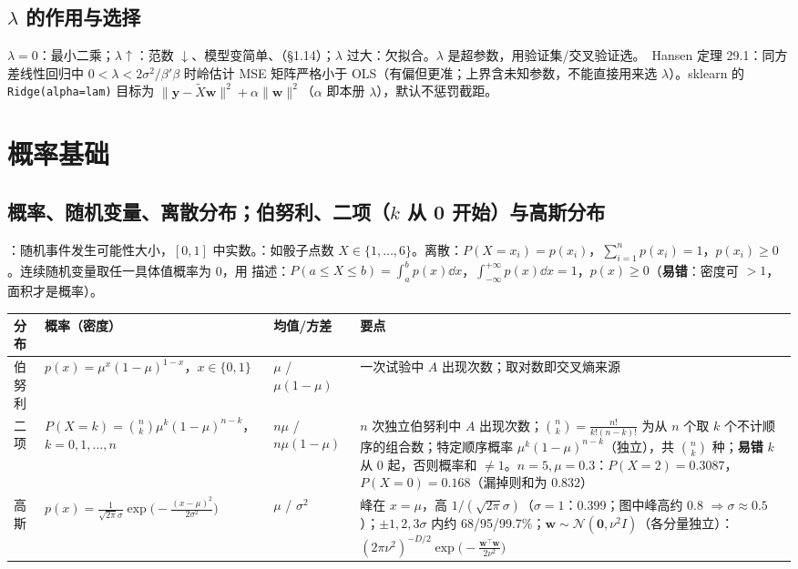 \subsection{\texorpdfstring{$\lambda$}{lambda} 的作用与选择}
$\lambda=0$：最小二乘；$\lambda\uparrow$：范数 $\downarrow$、模型变简单、（§1.14）；$\lambda$ 过大：欠拟合。$\lambda$ 是超参数，用验证集/交叉验证选。\tagext\ Hansen 定理 29.1：同方差线性回归中 $0<\lambda<2\sigma^2/\beta'\beta$ 时岭估计 MSE 矩阵严格小于 OLS（有偏但更准；上界含未知参数，不能直接用来选 $\lambda$）。sklearn 的 \texttt{Ridge(alpha=lam)} 目标为 $\|\bm y-\tilde X\bm w\|^2+\alpha\|\bm w\|^2$（$\alpha$ 即本册 $\lambda$），默认不惩罚截距。

\section{概率基础}

\subsection{概率、随机变量、离散分布；伯努利、二项（\texorpdfstring{$k$}{k} 从 0 开始）与高斯分布}
：随机事件发生可能性大小，$[0,1]$ 中实数。：如骰子点数 $X\in\{1,\dots,6\}$。离散：$P(X=x_i)=p(x_i)$，$\sum_{i=1}^np(x_i)=1$，$p(x_i)\ge0$。连续随机变量取任一具体值概率为 0，用 描述：$P(a\le X\le b)=\int_a^bp(x)\dd x$，$\int_{-\infty}^{+\infty}p(x)\dd x=1$，$p(x)\ge0$（\textbf{易错}：密度可 $>1$，面积才是概率）。
\begin{center}\small
\begin{tabularx}{\linewidth}{@{}p{1.9cm}>{\raggedright\arraybackslash}p{5.5cm}p{2cm}L@{}}
\toprule
分布 & 概率（密度）& 均值/方差 & 要点 \\
\midrule
伯努利 & $p(x)=\mu^x(1-\mu)^{1-x}$，$x\in\{0,1\}$ & $\mu$ / $\mu(1-\mu)$ & 一次试验中 $A$ 出现次数；取对数即交叉熵来源 \\
二项 & $P(X{=}k)=\binom nk\mu^k(1-\mu)^{n-k}$，$k=0,1,\dots,n$ & $n\mu$ / $n\mu(1-\mu)$ & $n$ 次独立伯努利中 $A$ 出现次数；$\binom nk=\frac{n!}{k!(n-k)!}$ 为从 $n$ 个取 $k$ 个不计顺序的组合数；特定顺序概率 $\mu^k(1-\mu)^{n-k}$（独立），共 $\binom nk$ 种；\textbf{易错} $k$ 从 0 起，否则概率和 $\neq1$。$n{=}5,\mu{=}0.3$：$P(X{=}2)=0.3087$，$P(X{=}0)=0.168$（漏掉则和为 $0.832$）\\
高斯 & $p(x)=\frac1{\sqrt{2\pi}\sigma}\exp\big(-\frac{(x-\mu)^2}{2\sigma^2}\big)$ & $\mu$ / $\sigma^2$ & 峰在 $x=\mu$，高 $1/(\sqrt{2\pi}\sigma)$（$\sigma{=}1$：0.399；图中峰高约 0.8 $\Rightarrow\sigma\approx0.5$）；$\pm1,2,3\sigma$ 内约 68/95/99.7\%；$\bm w\sim\mathcal N(\bm 0,\nu^2I)$（各分量独立）：$(2\pi\nu^2)^{-D/2}\exp\!\big(-\frac{\bm w^\top\bm w}{2\nu^2}\big)$ \\
\bottomrule
\end{tabularx}
\end{center}

